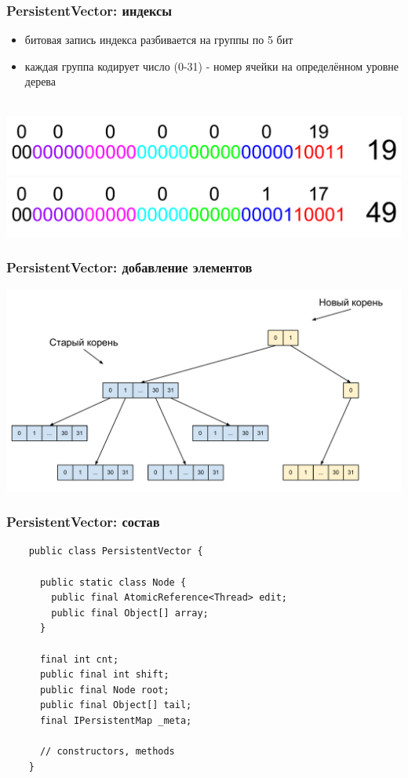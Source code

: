 \documentclass[rpussian]{beamer}
\begin{document}
\begin{frame}
  \frametitle{PersistentVector: индексы}
  \begin{itemize}
  \item битовая запись индекса разбивается на группы по 5 бит
  \item каждая группа кодирует число (0-31) - номер ячейки на определённом уровне дерева
  \end{itemize}
  \\ \vspace{0.5cm}
  \includegraphics[width=\textwidth,keepaspectration]{bits_19}
  \\ \vspace{0.5cm}
  \includegraphics[width=\textwidth,keepaspectration]{bits_49}
\end{frame}

\begin{frame}
  \frametitle{PersistentVector: добавление элементов}
  \includegraphics[width=\textwidth,keepaspectration]{32_tree_added_1}
\end{frame}

\begin{frame}[fragile]
  \frametitle{PersistentVector: состав}
  \begin{verbatim}
    public class PersistentVector {

      public static class Node {
        public final AtomicReference<Thread> edit;
        public final Object[] array;
      }

      final int cnt;
      public final int shift;
      public final Node root;
      public final Object[] tail;
      final IPersistentMap _meta;

      // constructors, methods
    }
  \end{verbatim}
\end{frame}
\end{document}
